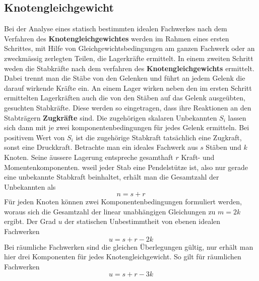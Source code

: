 \subsection{Knotengleichgewicht}
Bei der Analyse eines statisch bestimmten idealen Fachwerkes nach dem Verfahren des \textbf{Knotengleichgewichtes} werden im Rahmen eines ersten Schrittes, mit Hilfe von Gleichgewichtsbedingungen am ganzen Fachwerk oder an zweckmässig zerlegten Teilen, die Lagerkräfte ermittelt.
\newline\newline
In einem zweiten Schritt weden die Stabkräfte nach dem verfahren des \textbf{Knotengleichgewichts} ermittelt. Dabei trennt man die Stäbe von den Gelenken und führt an jedem Gelenk die darauf wirkende Kräfte ein. An einem Lager wirken neben den im ersten Schritt ermittelten Lagerkräften auch die von den Stäben auf das Gelenk ausgeübten, gesuchten Stabkräfte. Diese werden so eingetragen, dass ihre Reaktionen an den Stabträgern \textbf{Zugkräfte} sind. Die zugehörigen skalaren Unbekannten $S_i$ lassen sich dann mit je zwei komponentenbedingungen für jedes Gelenk ermitteln. Bei positivem Wert von $S_i$ ist die zugehörige Stabkraft tatsächlich eine Zugkraft, sonst eine Druckkraft.
\newline\newline
Betrachte man ein ideales Fachwerk aus $s$ Stäben und $k$ Knoten. Seine äussere Lagerung entspreche gesamthaft $r$ Kraft- und Momentenkomponenten. wseil jeder Stab eine Pendelstütze ist, also nur gerade eine unbekannte Stabkraft beinhaltet, erhält man die Gesamtzahl der Unbekannten als
\begin{equation}  
\boxed{n=s+r}
\end{equation}
Für jeden Knoten können zwei Komponentenbedingungen formuliert werden, woraus sich die Gesamtzahl der linear unabhängigen Gleichungen zu $m=2k$ ergibt. Der Grad $u$ der statischen Unbestimmtheit von ebenen idealen Fachwerken
\begin{equation}
\boxed{u=s+r-2k}
\end{equation}
Bei räumliche Fachwerken sind die gleichen Überlegungen gültig, nur erhält man hier drei Komponenten für jedes Knotengleichgewicht. So gilt für räumlichen Fachwerken
\begin{equation}
\boxed{u=s+r-3k}
\end{equation}
